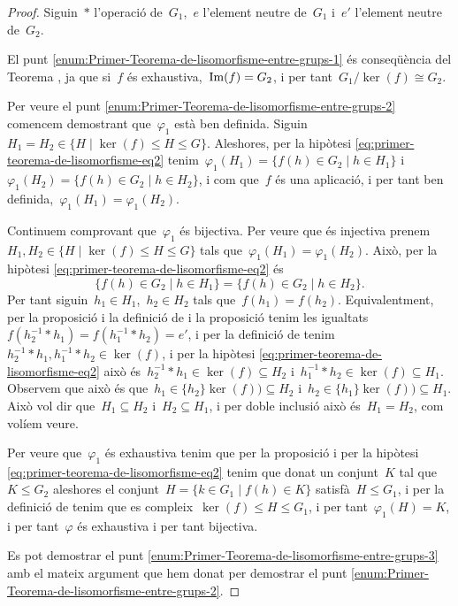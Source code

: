 \documentclass[../estructures-algebraiques.tex]{subfiles}
\begin{document}
    \begin{proof}
        Siguin~\(\ast\) l'operació de~\(G_{1}\),~\(e\) l'element neutre de~\(G_{1}\) i~\(e'\) l'element neutre de~\(G_{2}\).

        El punt \eqref{enum:Primer-Teorema-de-lisomorfisme-entre-grups-1} és conseqüència del Teorema , ja que si~\(f\) és exhaustiva,~\(\operatorname{Im}(f)=G_{2}\), i per tant~\(G_{1}/\ker(f)\cong G_{2}\).

        Per veure el punt \eqref{enum:Primer-Teorema-de-lisomorfisme-entre-grups-2} comencem demostrant que~\(\varphi_{1}\) està ben definida.
        Siguin~\(H_{1}=H_{2}\in\{H\mid\ker(f)\leq H\leq G\}\).
        Aleshores, per la hipòtesi \eqref{eq:primer-teorema-de-lisomorfisme-eq2} tenim~\(\varphi_{1}(H_{1})=\{f(h)\in G_{2}\mid h\in H_{1}\}\) i~\(\varphi_{1}(H_{2})=\{f(h)\in G_{2}\mid h\in H_{2}\}\), i com que~\(f\) és una aplicació, i per tant ben definida,~\(\varphi_{1}(H_{1})=\varphi_{1}(H_{2})\).

        Continuem comprovant que~\(\varphi_{1}\) és bijectiva.
        Per veure que és injectiva prenem~\(H_{1},H_{2}\in\{H\mid\ker(f)\leq H\leq G\}\) tals que~\(\varphi_{1}(H_{1})=\varphi_{1}(H_{2})\).
        Això, per la hipòtesi \eqref{eq:primer-teorema-de-lisomorfisme-eq2} és
        \[
            \{f(h)\in G_{2}\mid h\in H_{1}\}=\{f(h)\in G_{2}\mid h\in H_{2}\}.
        \]
        Per tant siguin~\(h_{1}\in H_{1}\),~\(h_{2}\in H_{2}\) tals que~\(f(h_{1})=f(h_{2})\).
        Equivalentment, per la proposició  i la definició de  i la proposició  tenim les igualtats~\(f(h_{2}^{-1}\ast h_{1})=f(h_{1}^{-1}\ast h_{2})=e'\), i per la definició de  tenim~\(h_{2}^{-1}\ast h_{1},h_{1}^{-1}\ast h_{2}\in\ker(f)\), i per la hipòtesi \eqref{eq:primer-teorema-de-lisomorfisme-eq2} això és~\(h_{2}^{-1}\ast h_{1}\in\ker(f)\subseteq H_{2}\) i~\(h_{1}^{-1}\ast h_{2}\in\ker(f)\subseteq H_{1}\).
        Observem que això és que~\(h_{1}\in\{h_{2}\}\ker(f))\subseteq H_{2}\) i~\(h_{2}\in\{h_{1}\}\ker(f))\subseteq H_{1}\).
        Això vol dir que~\(H_{1}\subseteq H_{2}\) i~\(H_{2}\subseteq H_{1}\), i per doble inclusió això és~\(H_{1}=H_{2}\), com volíem veure.

        Per veure que~\(\varphi_{1}\) és exhaustiva tenim que per la proposició  i per la hipòtesi \eqref{eq:primer-teorema-de-lisomorfisme-eq2} tenim que donat un conjunt~\(K\) tal que~\(K\leq G_{2}\) aleshores el conjunt~\(H=\{k\in G_{1}\mid f(h)\in K\}\) satisfà~\(H\leq G_{1}\), i per la definició de  tenim que es compleix~\(\ker(f)\leq H\leq G_{1}\), i per tant~\(\varphi_{1}(H)=K\), i per tant~\(\varphi\) és exhaustiva i per tant bijectiva.

        Es pot demostrar el punt \eqref{enum:Primer-Teorema-de-lisomorfisme-entre-grups-3} amb el mateix argument que hem donat per demostrar el punt \eqref{enum:Primer-Teorema-de-lisomorfisme-entre-grups-2}.
    \end{proof}
\end{document}
